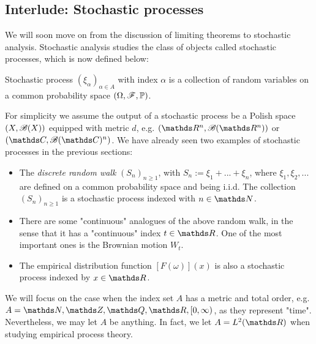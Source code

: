 \subsection{Interlude: Stochastic processes}

\begin{unexaminable}
We will soon move on from the discussion of limiting theorems to stochastic analysis. Stochastic analysis studies the class of objects called stochastic processes, which is now defined below: 
\begin{definition}
Stochastic process $(\xi_\alpha)_{\alpha \in A}$ with index $\alpha$ is a collection of random variables on a common probability space $(\Omega,\mathcal{F},\mathbb{P})$.
\end{definition}

For simplicity we assume the output of a stochastic process be a Polish space $(X,\mathcal{B}(X))$ equipped with metric $d$, e.g. $(\R^n, \B(\R^n))$ or $(\C,\B(\C)^n)$. We have already seen two examples of stochastic processes in the previous sections:
\begin{itemize}
\item The \textit{discrete random walk} $(S_n)_{n\geq 1}$, with $S_n := \xi_1 + ... + \xi_n$, where $\xi_1, \xi_2,...$ are defined on a common probability space and being i.i.d. The collection $(S_n)_{n\geq 1}$ is a stochastic process indexed with $n \in \N$.
\item There are some "continuous" analogues of the above random walk, in the sense that it has a "continuous" index $t \in \R$. One of the most important ones is the Brownian motion $W_t$.
\item The empirical distribution function $[F(\omega)](x)$ is also a stochastic process indexed by $x \in \R$.
\end{itemize}

We will focus on the case when the index set $A$ has a metric and total order, e.g. $A = \N, \Z, \Q, \R, [0,\infty)$, as they represent "time". Nevertheless, we may let $A$ be anything. In fact, we let $A = L^2(\R)$ when studying empirical process theory.\\


\end{unexaminable}
